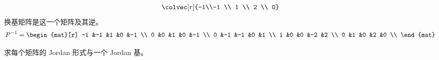 \begin{exercises}
\begin{answer}
\begin{exparts}
\begin{equation*}
{                 \colvec[r]{-1\\-1 \\  1 \\ 2 \\ 0}}
          \end{equation*}
          换基矩阵是这一个矩阵及其逆。
          \begin{equation*}
            P^{-1}=
            \begin{mat}[r]
              -1  &-1  &1  &0  &-1  \\
              0   &0   &1  &0  &-1  \\
              0   &-1  &-1 &0  &1   \\
              1   &0   &0  &-2 &2   \\
              0   &1   &0  &2  &0   \\
            \end{mat}
          \end{equation*}
      \end{exparts}
    \end{answer}
  \recommended \item 
    求每个矩阵的 Jordan 形式与一个 Jordan 基。
\end{exercises}
